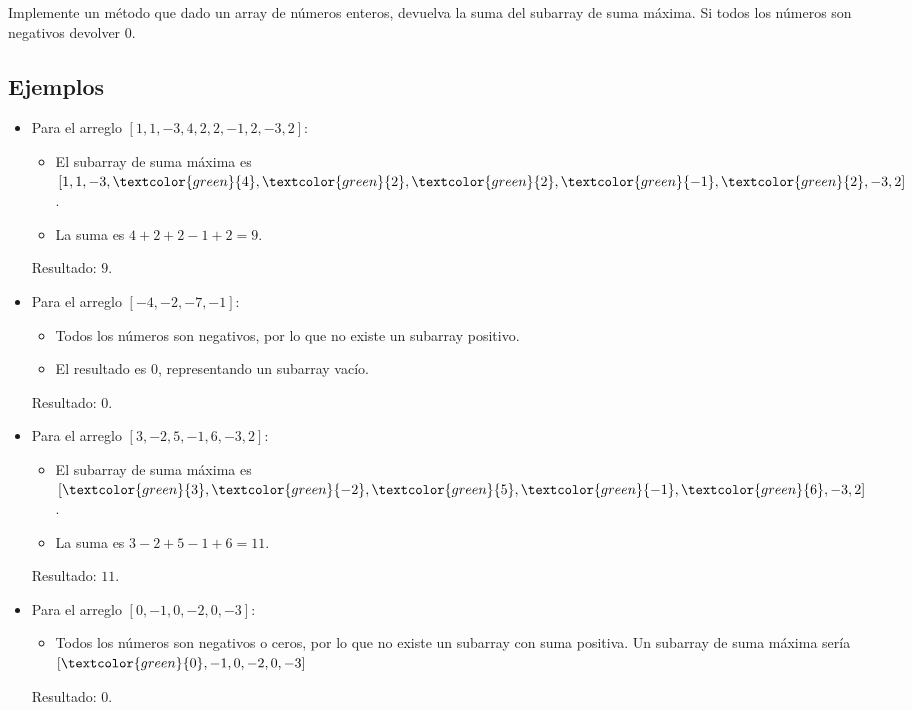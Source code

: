 Implemente un método que dado un array de números enteros, devuelva la suma del subarray de suma máxima. Si todos los números son negativos devolver 0.

\subsection*{Ejemplos}

\begin{itemize}
    \item Para el arreglo \([1, 1, -3, 4, 2, 2, -1, 2, -3, 2]\):
    \begin{itemize}
        \item El subarray de suma máxima es \([1, 1, -3, \textcolor{green}{4}, \textcolor{green}{2}, \textcolor{green}{2}, \textcolor{green}{-1}, \textcolor{green}{2}, -3, 2]\).
        \item La suma es \(4 + 2 + 2 - 1 + 2 = 9\).
    \end{itemize}
    Resultado: \(9\).
    
    \item Para el arreglo \([-4, -2, -7, -1]\):
    \begin{itemize}
        \item Todos los números son negativos, por lo que no existe un subarray positivo.
        \item El resultado es \(0\), representando un subarray vacío.
    \end{itemize}
    Resultado: \(0\).
    
    \item Para el arreglo \([3, -2, 5, -1, 6, -3, 2]\):
    \begin{itemize}
        \item El subarray de suma máxima es \([\textcolor{green}{3}, \textcolor{green}{-2}, \textcolor{green}{5}, \textcolor{green}{-1}, \textcolor{green}{6}, -3, 2]\).
        \item La suma es \(3 - 2 + 5 - 1 + 6 = 11\).
    \end{itemize}
    Resultado: \(11\).

    \item Para el arreglo \([0, -1, 0, -2, 0, -3]\):
    \begin{itemize}
        \item Todos los números son negativos o ceros, por lo que no existe un subarray con suma positiva. Un subarray de suma máxima sería \([\textcolor{green}{0}, -1, 0, -2, 0, -3]\)
    \end{itemize}
    Resultado: \(0\).
\end{itemize}
